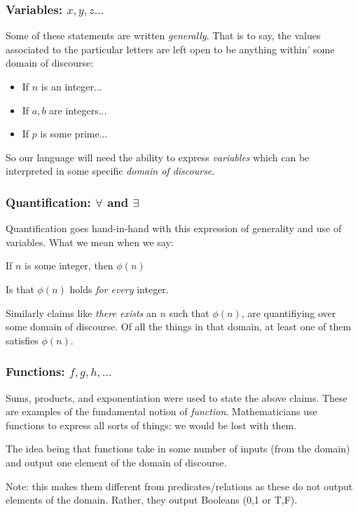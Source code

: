 \documentclass{beamer}
\begin{document}
\begin{frame}
	\frametitle{Variables: $x,y,z...$}
	
	Some of these statements are written \emph{generally}. That is to say, the values associated to the particular letters are left open to be anything within' some domain of discourse: 
	
	\vspace{0.5cm}
	
	\begin{itemize}
		\item If $n$ is an integer...
		\item If $a,b$ are integers...
		\item If $p$ is some prime...
	\end{itemize}

	\vspace{0.5cm}
	
	So our language will need the ability to express \emph{variables} which can be interpreted in some specific \emph{domain of discourse}. 
\end{frame}

\begin{frame}
	\frametitle{Quantification: $\forall$ and $\exists$}
	
	Quantification goes hand-in-hand with this expression of generality and use of variables. What we mean when we say: 
	
	\begin{center}
		If $n$ is some integer, then $\phi(n)$ 
	\end{center}

	Is that $\phi(n)$ holds \emph{for every} integer. 
	
	\vspace{0.5cm} 
	
	Similarly claims like \emph{there exists} an $n$ such that $\phi(n)$, are quantifiying over some domain of discourse. Of all the things in that domain, at least one of them satisfies $\phi(n)$. 
	
\end{frame}

\begin{frame}
	\frametitle{Functions: $f,g,h,...$}
	
	Sums, products, and exponentiation were used to state the above claims. These are examples of the fundamental notion of \emph{function}. Mathematicians use functions to express all sorts of things: we would be lost with them. 
	
	\vspace{0.5cm}
	
	The idea being that functions take in some number of inputs (from the domain) and output one element of the domain of discourse. 
	
	\vspace{0.5cm} 
	
	Note: this makes them different from predicates/relations as these do not output elements of the domain. Rather, they output Booleans (0,1 or T,F).

\end{frame}
\end{document}
